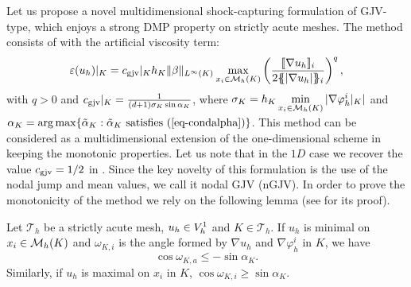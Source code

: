 Let us propose a novel multidimensional shock-capturing formulation of GJV-type, which enjoys a strong DMP property on strictly
acute meshes. The method consists of  with  the artificial viscosity term:
\begin{align}\label{eq-gjvisc0}
\varepsilon(u_h)|_K = c_{\rm gjv}|_K h_K \|\beta\|_{L^\infty(K)} \max_{x_i \in \mathcal{M}_h(K)}\left(\frac{ \lbrack\!\lbrack \nabla u_h \rbrack\!\rbrack_i }{2\{\! \!\{ |\nabla u_h|\}\! \!\}_i}\right)^q,
\end{align}
with $q>0$ and $c_{\rm gjv}|_K = \frac{1}{(d+1)\sigma_K \sin \alpha_K}$, where $\sigma_K = h_K \min\limits_{x_i \in \mathcal{M}_h(K)} |\nabla\varphi^i_h|_K|$ and $\alpha_K = {\rm arg} \max \{ \tilde \alpha_K:  \tilde \alpha_K \hbox{ satisfies \Eq{condalpha}}\}$. This method can be considered as a multidimensional extension of the one-dimensional scheme in \cite{burman_nonlinear_2007} keeping the monotonic properties.  Let us note that in the $1D$ case we recover the value $c_{\rm gjv} = 1/2$ in \cite{burman_nonlinear_2007}. Since the key novelty of this formulation is the use of the nodal jump and mean values, we call it nodal GJV (nGJV). 
In order to prove the monotonicity of the method we rely on the following lemma (see \cite{burman_nonlinear_2002} for its proof).
\begin{lemma}\label{lem-stracute}
Let $\mathcal{T}_h$ be a strictly acute mesh, $u_h\in V_h^1$ and $K\in\mathcal{T}_h$. If $u_h$ is minimal on $x_i \in \mathcal{M}_h(K)$ and $\omega_{K,i}$ is the angle formed by $\nabla u_h$ and $\nabla \varphi_h^i$ in $K$, we have
$$\cos \omega_{K,a} \leq - \sin \alpha_K.$$
Similarly, if $u_h$ is maximal on $x_i$ in $K$, $\cos \omega_{K,i} \geq  \sin \alpha_K$.
\end{lemma}

